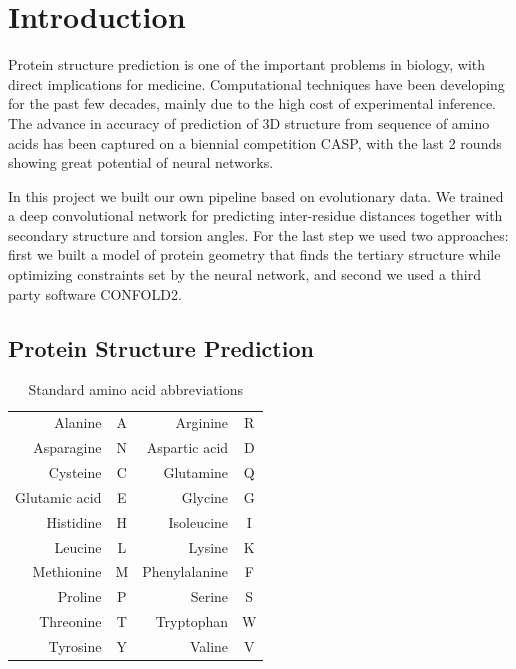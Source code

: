 \chapter{Introduction}

Protein structure prediction is one of the important problems in biology, with direct implications for medicine. Computational techniques have been developing for the past few decades, mainly due to the high cost of experimental inference. The advance in accuracy of prediction of 3D structure from sequence of amino acids has been captured on a biennial competition CASP, with the last 2 rounds showing great potential of neural networks. 
    
    In this project we built our own pipeline based on evolutionary data. We trained a deep convolutional network for predicting inter-residue distances together with secondary structure and torsion angles. For the last step we used two approaches: first we built a model of protein geometry that finds the tertiary structure while optimizing constraints set by the neural network, and second we used a third party software CONFOLD2.
\section{Protein Structure Prediction}%

\begin{table}
    \centering
    \begin{tabular}{r|c|r|c|}
        Alanine & A & Arginine & R \\
        Asparagine & N & Aspartic acid & D \\
        Cysteine & C & Glutamine & Q \\
        Glutamic acid & E & Glycine & G \\
        Histidine & H & Isoleucine & I \\
        Leucine & L & Lysine & K \\
        Methionine & M & Phenylalanine & F \\
        Proline & P & Serine & S \\
        Threonine & T & Tryptophan & W \\
        Tyrosine & Y & Valine & V
    \end{tabular}
    \caption{Standard amino acid abbreviations}
    \label{tab:aa_codes}
\end{table}

